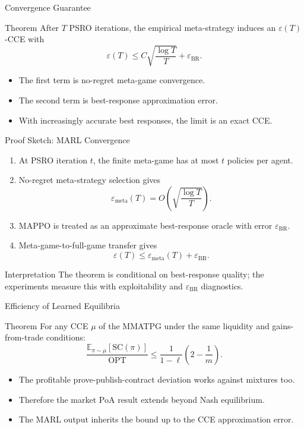 \documentclass[10pt,aspectratio=169]{beamer}
\newcommand{\SC}{\mathrm{SC}}
\newcommand{\OPT}{\mathrm{OPT}}
\begin{document}
\begin{frame}{Convergence Guarantee}
\small
\begin{block}{Theorem}
After $T$ PSRO iterations, the empirical meta-strategy induces an $\varepsilon(T)$-CCE with
\[
\varepsilon(T)\le
C\sqrt{\frac{\log T}{T}}+\varepsilon_{\mathrm{BR}}.
\]
\end{block}

\begin{itemize}
  \item The first term is no-regret meta-game convergence.
  \item The second term is best-response approximation error.
  \item With increasingly accurate best responses, the limit is an exact CCE.
\end{itemize}
\end{frame}

\begin{frame}{Proof Sketch: MARL Convergence}
\small
\begin{enumerate}
  \item At PSRO iteration $t$, the finite meta-game has at most $t$ policies per agent.
  \item No-regret meta-strategy selection gives
  \[
  \varepsilon_{\mathrm{meta}}(T)=O\!\left(\sqrt{\frac{\log T}{T}}\right).
  \]
  \item MAPPO is treated as an approximate best-response oracle with error $\varepsilon_{\mathrm{BR}}$.
  \item Meta-game-to-full-game transfer gives
  \[
  \varepsilon(T)\le \varepsilon_{\mathrm{meta}}(T)+\varepsilon_{\mathrm{BR}}.
  \]
\end{enumerate}

\begin{block}{Interpretation}
The theorem is conditional on best-response quality; the experiments measure this with exploitability and $\varepsilon_{\mathrm{BR}}$ diagnostics.
\end{block}
\end{frame}

\begin{frame}{Efficiency of Learned Equilibria}
\small
\begin{block}{Theorem}
For any CCE $\mu$ of the MMATPG under the same liquidity and gains-from-trade conditions:
\[
\frac{\mathbb{E}_{\pi\sim\mu}[\SC(\pi)]}{\OPT}
\le
\frac{1}{1-\ell}\left(2-\frac{1}{m}\right).
\]
\end{block}

\begin{itemize}
  \item The profitable prove-publish-contract deviation works against mixtures too.
  \item Therefore the market PoA result extends beyond Nash equilibrium.
  \item The MARL output inherits the bound up to the CCE approximation error.
\end{itemize}
\end{frame}
\end{document}
